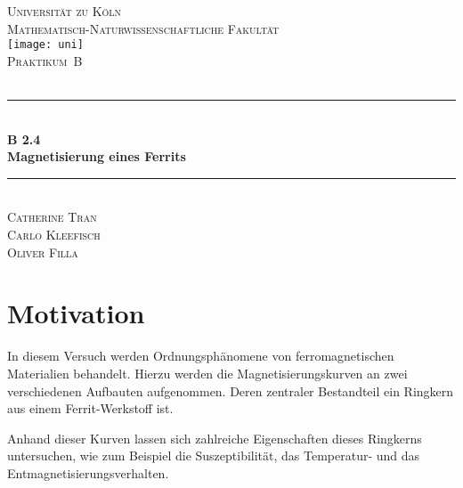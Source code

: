 \documentclass[12pt,a4paper]{scrartcl}
\numberwithin{equation}{section} %
\newcommand{\HRule}{\rule{\linewidth}{0.7mm}}
\renewcommand{\[}{} %
\renewcommand{\]}{\noindent} %
\begin{document}
\begin{titlepage}
	\pagestyle{empty}

	\begin{center}

	\textsc{\LARGE Universität zu Köln }\\ [0.4cm]
	\textsc{Mathematisch-Naturwissenschaftliche Fakultät} \\[1.5cm]

	\texttt{[image: uni]}\\[1.5cm]  %

	\textsc{\Large Praktikum~B}\\[2mm]
	\textsc{}\\[10mm]
	\HRule \\[0.4cm]

		{	\Huge \bfseries B 2.4}\\[0.4cm]
			{	\huge \bfseries Magnetisierung eines Ferrits}\\[0.3cm]
	
	\HRule \\[3cm]

			\textsc{\Large Catherine Tran } \\[3pt]
		\textsc{\Large Carlo Kleefisch } \\[3pt]
		\textsc{\Large Oliver Filla } \\[3pt]
		
	\end{center}
\end{titlepage}

\newpage
\tableofcontents
\newpage

\hypertarget{motivation}{%
\section{Motivation}\label{motivation}}

In diesem Versuch werden Ordnungsphänomene von ferromagnetischen
Materialien behandelt. Hierzu werden die Magnetisierungskurven an zwei
verschiedenen Aufbauten aufgenommen. Deren zentraler Bestandteil ein
Ringkern aus einem Ferrit-Werkstoff ist.

Anhand dieser Kurven lassen sich zahlreiche Eigenschaften dieses
Ringkerns untersuchen, wie zum Beispiel die Suszeptibilität, das
Temperatur- und das Entmagnetisierungsverhalten.
\end{document}
